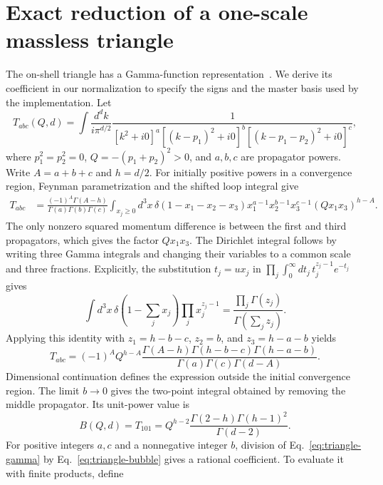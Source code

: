 \section{Exact reduction of a one-scale massless triangle}
\label{app:triangle}
The on-shell triangle has a Gamma-function representation~\cite{DavydychevOsland1998}. We derive its coefficient in our normalization to specify the signs and the master basis used by the implementation. Let
\begin{equation}
 T_{abc}(Q,d)=\int\frac{d^d k}{i\pi^{d/2}}
 \frac{1}{[k^2+i0]^a[(k-p_1)^2+i0]^b[(k-p_1-p_2)^2+i0]^c},
 \label{eq:triangle-definition}
\end{equation}
where $p_1^2=p_2^2=0$, $Q=-(p_1+p_2)^2>0$, and $a,b,c$ are propagator powers. Write $A=a+b+c$ and $h=d/2$. For initially positive powers in a convergence region, Feynman parametrization and the shifted loop integral give
\begin{align}
 T_{abc}&=\frac{(-1)^A\Gamma(A-h)}{\Gamma(a)\Gamma(b)\Gamma(c)}
 \int_{x_j\geq0} d^3x\,\delta(1-x_1-x_2-x_3)
 x_1^{a-1}x_2^{b-1}x_3^{c-1}(Qx_1x_3)^{h-A}.
 \label{eq:triangle-parameters}
\end{align}
The only nonzero squared momentum difference is between the first and third propagators, which gives the factor $Qx_1x_3$. The Dirichlet integral follows by writing three Gamma integrals and changing their variables to a common scale and three fractions. Explicitly, the substitution $t_j=u x_j$ in $\prod_j\int_0^\infty dt_j\,t_j^{z_j-1}e^{-t_j}$ gives
\begin{equation}
 \int d^3x\,\delta(1-\textstyle\sum_j x_j)\prod_jx_j^{z_j-1}
 =\frac{\prod_j\Gamma(z_j)}{\Gamma(\sum_jz_j)}.
 \label{eq:triangle-dirichlet}
\end{equation}
Applying this identity with $z_1=h-b-c$, $z_2=b$, and $z_3=h-a-b$ yields
\begin{equation}
 T_{abc}=(-1)^A Q^{h-A}
 \frac{\Gamma(A-h)\Gamma(h-b-c)\Gamma(h-a-b)}
 {\Gamma(a)\Gamma(c)\Gamma(d-A)}.
 \label{eq:triangle-gamma}
\end{equation}
Dimensional continuation defines the expression outside the initial convergence region. The limit $b\to0$ gives the two-point integral obtained by removing the middle propagator. Its unit-power value is
\begin{equation}
 B(Q,d)=T_{101}=Q^{h-2}
 \frac{\Gamma(2-h)\Gamma(h-1)^2}{\Gamma(d-2)}.
 \label{eq:triangle-bubble}
\end{equation}
For positive integers $a,c$ and a nonnegative integer $b$, division of Eq.~\eqref{eq:triangle-gamma} by Eq.~\eqref{eq:triangle-bubble} gives a rational coefficient. To evaluate it with finite products, define

